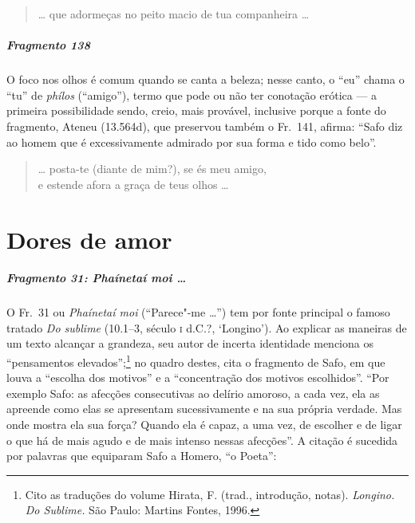 {\begin{verse}
\ldots{} que adormeças no peito macio de tua \qb{}companheira \ldots{} 
\end{verse}


\paragraph{Fragmento 138}

{\small O foco nos olhos é comum quando se canta a beleza; nesse canto, o “eu” chama o
“tu” de \textit{phílos }(``amigo”), termo que pode ou não ter conotação
erótica --- a primeira possibilidade sendo, creio, mais provável, inclusive
porque a fonte do fragmento, Ateneu (13.564d), que preservou também o Fr.~141, afirma:
``Safo diz ao homem que é excessivamente admirado por sua forma e tido como belo''.}

\begin{verse}
\ldots{} posta-te (diante de mim?), se és meu amigo,\\
e estende afora a graça de teus olhos \ldots{}
\end{verse}


\chapter{Dores de amor}


\paragraph{Fragmento 31: \textit{Phaínetaí moi \ldots{}}}


{\small O Fr.~31 ou \textit{Phaínetaí moi} (“Parece"-me \ldots{}”) tem por fonte
principal o famoso tratado \textit{Do sublime} (10.1--3, século \textsc{i} d.C.?, `Longino'). Ao
explicar as maneiras de um texto alcançar a grandeza, seu autor de incerta identidade menciona os
“pensamentos elevados”;\footnote{ Cito as traduções do volume Hirata,
F. (trad., introdução, notas). \textit{Longino.} \textit{Do Sublime.} São
Paulo: Martins Fontes, 1996.} no quadro destes, cita o fragmento de Safo,
em que louva a “escolha dos motivos” e a “concentração dos
motivos escolhidos”. ``Por exemplo Safo: as afecções consecutivas ao delírio
amoroso, a cada vez, ela as apreende como elas se apresentam sucessivamente e
na sua própria verdade. Mas onde mostra ela sua força? Quando ela é capaz, a
uma vez, de escolher e de ligar o que há de mais agudo e de mais
intenso nessas afecções”. A citação é sucedida por palavras que equiparam Safo
a Homero, “o Poeta”: 

}}
